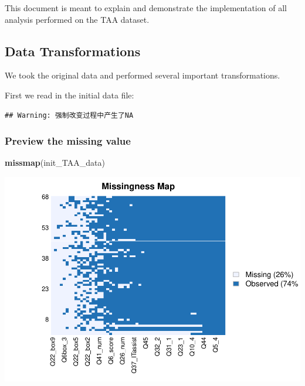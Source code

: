 \documentclass[
]{article}
\newenvironment{Shaded}{\begin{snugshade}}{\end{snugshade}}
\newcommand{\CommentTok}[1]{\textcolor[rgb]{0.56,0.35,0.01}{\textit{#1}}}
\newcommand{\KeywordTok}[1]{\textcolor[rgb]{0.13,0.29,0.53}{\textbf{#1}}}
\newcommand{\NormalTok}[1]{#1}
\newcommand{\OperatorTok}[1]{\textcolor[rgb]{0.81,0.36,0.00}{\textbf{#1}}}
\newcommand{\StringTok}[1]{\textcolor[rgb]{0.31,0.60,0.02}{#1}}
\begin{document}
This document is meant to explain and demonstrate the implementation of
all analysis performed on the TAA dataset.

\hypertarget{data-transformations}{%
\subsection{Data Transformations}\label{data-transformations}}

We took the original data and performed several important
transformations.

First we read in the initial data file:

\begin{Shaded}
\end{Shaded}

\begin{verbatim}
## Warning: 强制改变过程中产生了NA
\end{verbatim}

\hypertarget{preview-the-missing-value}{%
\subsubsection{Preview the missing
value}\label{preview-the-missing-value}}

\begin{Shaded}
\begin{Highlighting}[]
\KeywordTok{missmap}\NormalTok{(init_TAA_data)}
\end{Highlighting}
\end{Shaded}

\includegraphics{markdown_report_files/figure-latex/unnamed-chunk-2-1.pdf}
\end{document}
